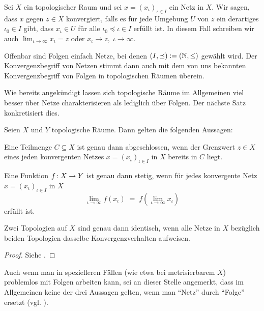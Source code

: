 \documentclass[../main/main.tex]{subfiles}
\begin{document}
	\begin{Definition}
		Sei $X$ ein topologischer Raum und sei $x = (x_\iota)_{\iota \in I}$ ein Netz in $X$. Wir sagen, dass $x$ gegen $z \in X$ konvergiert, falls
		es für jede Umgebung $U$ von $z$ ein derartiges $\iota_0 \in I$ gibt, dass $x_\iota \in U$ für alle $\iota_0 \preceq \iota \in I$ erfüllt ist.
		In diesem Fall schreiben wir auch $\lim_{\iota \to \infty} x_\iota = z$ oder $x_\iota \to z, \; \iota \to \infty$.
	\end{Definition}
	
	\begin{Bemerkung}
		Offenbar sind Folgen einfach Netze, bei denen $(I, \preceq) \vcentcolon = (\mathbb{N}, \leq)$ gewählt wird. Der Konvergenzbegriff von Netzen stimmt
		dann auch mit dem von uns bekannten Konvergenzbegriff von Folgen in topologischen Räumen überein.
	\end{Bemerkung}
	
	Wie bereits angekündigt lassen sich topologische Räume im Allgemeinen viel besser über Netze charakterisieren als lediglich über Folgen. Der nächste Satz
	konkretisiert dies.
	
	\begin{Satz}
		\label{thm:netconvergence}
		Seien $X$ und $Y$ topologische Räume. Dann gelten die folgenden Aussagen:
		\begin{enumeratethm}
			\item Eine Teilmenge $C \subseteq X$ ist genau dann abgeschlossen, wenn der Grenzwert $z \in X$ eines jeden konvergenten Netzes 
			$x = (x_\iota)_{\iota \in I}$ in $X$ bereits in $C$ liegt.
			\item Eine Funktion $f \colon X \to Y$ ist genau dann stetig, wenn für jedes konvergente Netz $x = (x_\iota)_{\iota \in I}$ in $X$ 
			\[ \lim_{\iota \to \infty} f(x_\iota) \; = \; f(\lim_{\iota \to \infty} x_\iota) \]
			erfüllt ist.
			\item Zwei Topologien auf $X$ sind genau dann identisch, wenn alle Netze in $X$ bezüglich beiden Topologien dasselbe Konvergenzverhalten aufweisen.
		\end{enumeratethm}
	\end{Satz}
	
	\begin{proof}
		Siehe \cite[Satz 2.6.3]{Simon.2015}.
	\end{proof}
	
	\begin{Bemerkung}
		Auch wenn man in spezielleren Fällen (wie etwa bei metrisierbarem $X$) problemlos mit Folgen arbeiten kann, sei an dieser Stelle angemerkt, dass im Allgemeinen 
		keine der drei Aussagen gelten, wenn man \enquote{Netz} durch \enquote{Folge} ersetzt (vgl. \cite[Beispiel 2.6.1]{Simon.2015}).
	\end{Bemerkung}
	
\end{document}
